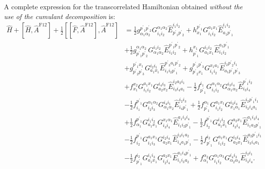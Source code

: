 \documentclass[aip,onecolumn,preprint]{revtex4-1}
\begin{document}
A complete expression for the transcorrelated Hamiltonian
obtained {\em without the use of the cumulant decomposition} is:
\begin{align}
\label{eq:H}
\hat{H} + [\hat{H}, \hat{A}^\mathrm{F12}] + \frac{1}{2} [[\hat{F}, \hat{A}^\mathrm{F12}], \hat{A}^\mathrm{F12}] & = {{{\frac{1}{2}}}{g^{{{p^\prime}_1}{{p^\prime}_2}}_{{\alpha_1}{\alpha_2}}}{G^{{\alpha_1}{\alpha_2}}_{{i_1}{i_2}}}{\hat{E}^{{i_1}{i_2}}_{{{p^\prime}_1}{{p^\prime}_2}}}} + {{h^{{{p^\prime}_1}}_{{x_1}}}{G^{{a_1}{x_1}}_{{i_1}{i_2}}}{\hat{E}^{{i_1}{i_2}}_{{a_1}{{p^\prime}_1}}}} \nonumber \\
  & + {{{\frac{1}{2}}}{g^{{\alpha_1}{\alpha_2}}_{{{p^\prime}_1}{{p^\prime}_2}}}{G^{{i_1}{i_2}}_{{\alpha_1}{\alpha_2}}}{\hat{E}^{{{p^\prime}_1}{{p^\prime}_2}}_{{i_1}{i_2}}}} + {{h^{{x_1}}_{{{p^\prime}_1}}}{G^{{i_1}{i_2}}_{{a_1}{x_1}}}{\hat{E}^{{a_1}{{p^\prime}_1}}_{{i_1}{i_2}}}} \nonumber \\
  & + {{g^{{{p^\prime}_1}{x_1}}_{{{p^\prime}_2}{{p^\prime}_3}}}{G^{{i_2}{i_1}}_{{a_1}{x_1}}}{\hat{E}^{{{p^\prime}_3}{a_1}{{p^\prime}_2}}_{{i_1}{i_2}{{p^\prime}_1}}}} + {{g^{{{p^\prime}_1}{{p^\prime}_3}}_{{{p^\prime}_2}{x_1}}}{G^{{x_1}{a_1}}_{{i_1}{i_2}}}{\hat{E}^{{i_2}{{p^\prime}_2}{i_1}}_{{a_1}{{p^\prime}_1}{{p^\prime}_3}}}}  \nonumber \\
  & + {{f^{{x_2}}_{{x_1}}}{G^{{a_1}{x_1}}_{{i_1}{i_2}}}{G^{{i_4}{i_3}}_{{a_2}{x_2}}}{\hat{E}^{{i_2}{a_2}{i_1}}_{{i_3}{i_4}{a_1}}}} - {{{\frac{1}{2}}}{f^{{i_1}}_{{{p^\prime}_1}}}{G^{{\alpha_1}{\alpha_2}}_{{i_1}{i_2}}}{G^{{i_3}{i_4}}_{{\alpha_1}{\alpha_2}}}{\hat{E}^{{{p^\prime}_1}{i_2}}_{{i_3}{i_4}}}} \nonumber \\
  & - {{{\frac{1}{2}}}{f^{{{p^\prime}_1}}_{{i_1}}}{G^{{\alpha_1}{\alpha_2}}_{{i_2}{i_3}}}{G^{{i_4}{i_1}}_{{\alpha_1}{\alpha_2}}}{\hat{E}^{{i_2}{i_3}}_{{i_4}{{p^\prime}_1}}}} + {{{\frac{1}{2}}}{f^{{\alpha_1}}_{{{p^\prime}_1}}}{G^{{a_1}{x_1}}_{{i_1}{i_2}}}{G^{{i_3}{i_4}}_{{x_1}{\alpha_1}}}{\hat{E}^{{i_2}{{p^\prime}_1}{i_1}}_{{i_3}{i_4}{a_1}}}} \nonumber \\
  & + {{{\frac{1}{2}}}{f^{{{p^\prime}_1}}_{{\alpha_1}}}{G^{{i_1}{i_2}}_{{a_1}{x_1}}}{G^{{x_1}{\alpha_1}}_{{i_3}{i_4}}}{\hat{E}^{{a_1}{i_3}{i_4}}_{{i_1}{i_2}{{p^\prime}_1}}}} - {{{\frac{1}{2}}}{f^{{{p^\prime}_1}}_{{i_2}}}{G^{{i_1}{i_2}}_{{a_1}{x_1}}}{G^{{a_2}{x_1}}_{{i_3}{i_4}}}{\hat{E}^{{a_1}{i_3}{i_4}}_{{i_1}{a_2}{{p^\prime}_1}}}} \nonumber \\
  & - {{{\frac{1}{2}}}{f^{{{p^\prime}_1}}_{{i_2}}}{G^{{a_1}{x_1}}_{{i_1}{i_3}}}{G^{{i_2}{i_4}}_{{a_2}{x_1}}}{\hat{E}^{{i_3}{i_1}{a_2}}_{{i_4}{a_1}{{p^\prime}_1}}}} - {{{\frac{1}{2}}}{f^{{i_2}}_{{{p^\prime}_1}}}{G^{{a_1}{x_1}}_{{i_1}{i_2}}}{G^{{i_3}{i_4}}_{{a_2}{x_1}}}{\hat{E}^{{a_2}{{p^\prime}_1}{i_1}}_{{i_3}{i_4}{a_1}}}} \nonumber \\
  & - {{{\frac{1}{2}}}{f^{{i_2}}_{{{p^\prime}_1}}}{G^{{i_1}{i_3}}_{{a_1}{x_1}}}{G^{{a_2}{x_1}}_{{i_2}{i_4}}}{\hat{E}^{{a_1}{i_4}{{p^\prime}_1}}_{{i_1}{i_3}{a_2}}}} + {{f^{{\alpha_2}}_{{\alpha_1}}}{G^{{\alpha_1}{\alpha_3}}_{{i_1}{i_2}}}{G^{{i_4}{i_3}}_{{\alpha_2}{\alpha_3}}}{\hat{E}^{{i_2}{i_1}}_{{i_3}{i_4}}}}.
\end{align}
\end{document}
